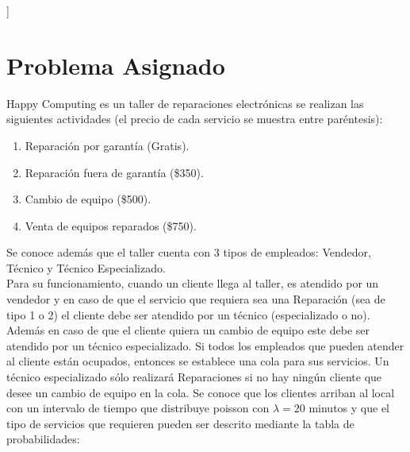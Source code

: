 \documentclass[a4paper,10pt,twocolumn]{article}
\begin{document}
\vspace{0.8cm}
]



\section{Problema Asignado}\label{sec:intro}
Happy Computing es un taller de reparaciones electrónicas se realizan las
siguientes actividades (el precio de cada servicio se muestra entre paréntesis): 
\begin{enumerate}
	\item Reparación por garantía (Gratis).
	\item Reparación fuera de garantía (\$350).
	\item Cambio de equipo (\$500).
	\item  Venta de equipos reparados (\$750).
\end{enumerate}

Se conoce además que el taller cuenta con 3 tipos de empleados: Vendedor, Técnico y Técnico Especializado. \\
Para su funcionamiento, cuando un cliente llega al taller, es atendido por un vendedor y en caso de que el servicio que requiera sea una Reparación (sea de tipo 1 o 2) el cliente debe ser atendido por un técnico (especializado o no). \\
Además en caso de que el cliente quiera un cambio de equipo este debe ser atendido por un técnico especializado. Si todos los empleados que pueden atender al cliente están ocupados, entonces se establece una cola para sus servicios. Un
técnico especializado sólo realizará Reparaciones si no hay ningún cliente que desee un cambio de equipo en la cola.
Se conoce que los clientes arriban al local con un intervalo de tiempo que distribuye poisson con $\lambda = 20$ minutos y que el tipo de servicios que requieren pueden ser descrito mediante la tabla de probabilidades:
\end{document}

